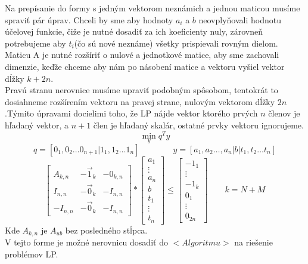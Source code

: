\documentclass{article}
\begin{document}
Na prepísanie do formy s jedným vektorom neznámich a jednou maticou musíme spraviť pár úprav. Chceli by sme aby hodnoty $a_i$ a $b$ neovplyňovali hodnotu účelovej funkcie, čiže je nutné dosadiť za ich koeficienty nuly, zárovneň potrebujeme aby $t_i$(čo sú nové neznáme) všetky prispievali rovným dielom.\\
Maticu A je nutné rozšíriť o nulové a jednotkové matice, aby sme zachovali dimenzie, keďže chceme aby nám po násobení matice a vektoru vyšiel vektor dĺžky $k + 2n$. \\Pravú stranu nerovnice musíme upraviť podobným spôsobom, tentokrát to dosiahneme rozšírením vektoru na pravej strane, nulovým vektorom dĺžky $2n$.Týmito úpravami docielimi toho, že LP nájde vektor ktorého prvých $n$ členov je hľadaný vektor, a $n+1$ člen je hľadaný skalár, ostatné prvky vektoru ignorujeme.
\\
\[\min_y q^T y \]
\[q = [0_1,0_2 \ldots 0_{n+1}|1_1, 1_2 \ldots 1_{n}] \qquad 
\qquad y = [a_1,a_2\ldots,a_{n}|b|t_1, t_2 \ldots t_{n}]\]
\[
\begin{bmatrix}
A_{k,n} & -\Vec{1}_k & -0_{k,n}\\ 
I_{n,n} & -\Vec{0}_k & -I_{n,n} \\ 
-I_{n,n} & -\Vec{0}_k & -I_{n,n}
\end{bmatrix}
*
\begin{bmatrix}
a_1\\ \vdots \\a_n \\ \hline  b \\ \hline t_1\\\vdots \\t_n
\end{bmatrix}
\leq
\begin{bmatrix}
-1_1\\ \vdots \\-1_k \\ \hline 0_1 \\\vdots \\ 0_{2n} 
\end{bmatrix}
\qquad k = N + M\]
Kde $A_{k,n}$ je $A_{ub}$ bez posledného stĺpca.\\
V tejto forme je možné nerovnicu dosadiť do $<Algoritmu>$ na riešenie problémov LP.
\end{document}
